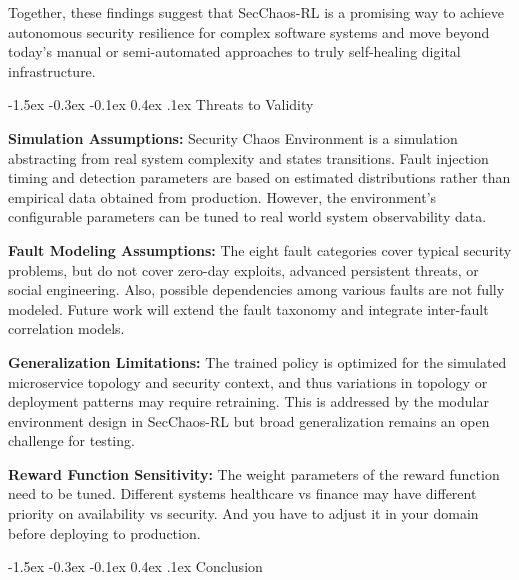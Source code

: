 \documentclass[conference,10pt]{IEEEtran}
\makeatletter
\renewcommand\section{\@startsection{section}{1}{\z@}%
	{-1.5ex \@plus -0.3ex \@minus -0.1ex}%
	{0.4ex \@plus.1ex}%
	{\normalfont\large\bfseries\centering}}
\makeatother
\begin{document}
	Together, these findings suggest that SecChaos-RL is a promising way to achieve autonomous security resilience for complex software systems and move beyond today’s manual or semi-automated approaches to truly self-healing digital infrastructure. 
	
	\section{Threats to Validity}
	
	\textbf{Simulation Assumptions:} Security Chaos Environment is a simulation abstracting from real system complexity and states transitions. Fault injection timing and detection parameters are based on estimated distributions rather than empirical data obtained from production. However, the environment’s configurable parameters can be tuned to real world system observability data. 
	
	\textbf{Fault Modeling Assumptions:} The eight fault categories cover typical security problems, but do not cover zero-day exploits, advanced persistent threats, or social engineering. Also, possible dependencies among various faults are not fully modeled. Future work will extend the fault taxonomy and integrate inter-fault correlation models. 
	
	\textbf{Generalization Limitations:} The trained policy is optimized for the simulated microservice topology and security context, and thus variations in topology or deployment patterns may require retraining. This is addressed by the modular environment design in SecChaos-RL but broad generalization remains an open challenge for testing. 
	
	\textbf{Reward Function Sensitivity:} The weight parameters of the reward function need to be tuned. Different systems  healthcare vs finance may have different priority on availability vs security. And you have to adjust it in your domain before deploying to production. 
	

	\section{Conclusion}
	
\end{document}
